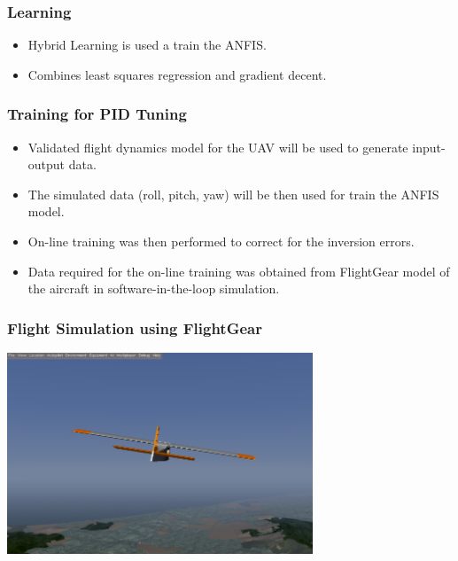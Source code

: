 \documentclass{beamer}
\begin{document}
   \begin{frame}
      \frametitle{Learning}
      \begin{itemize}
         \item Hybrid Learning is used a train the ANFIS.
         \item Combines least squares regression and gradient decent.
      \end{itemize}
   \end{frame}
   
   \begin{frame}
      \frametitle{Training for PID Tuning}
      \begin{itemize}
         \item Validated flight dynamics model for the UAV will be used to generate input-output data.
         \item The simulated data (roll, pitch, yaw) will be then used for train the ANFIS model.
         \item On-line training was then performed to correct for the inversion errors.
         \item Data required for the on-line training was obtained from FlightGear model of the aircraft in software-in-the-loop simulation.
      \end{itemize}
   \end{frame}
   
   \begin{frame}
      \frametitle{Flight Simulation using FlightGear}
      \includegraphics[height=6cm]{flightgear}
   \end{frame}
\end{document}

